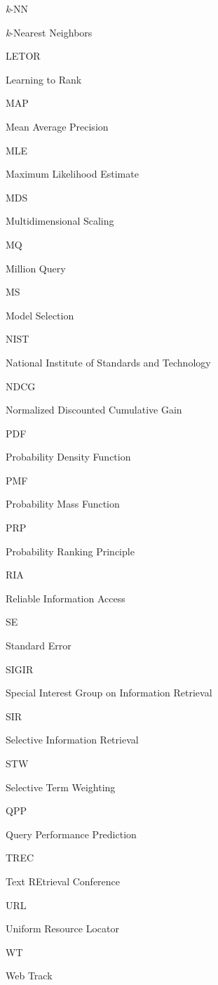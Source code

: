 \noindent \parbox[t]{1.5in}{\emph{k}-NN}
\parbox[t]{5in}{\emph{k}-Nearest Neighbors}

\noindent \parbox[t]{1.5in}{LETOR}
\parbox[t]{5in}{Learning to Rank}

\noindent \parbox[t]{1.5in}{MAP}
\parbox[t]{5in}{Mean Average Precision}

\noindent \parbox[t]{1.5in}{MLE}
\parbox[t]{5in}{Maximum Likelihood Estimate}

\noindent \parbox[t]{1.5in}{MDS}
\parbox[t]{5in}{Multidimensional Scaling}

\noindent \parbox[t]{1.5in}{MQ}
\parbox[t]{5in}{Million Query}

\noindent \parbox[t]{1.5in}{MS}
\parbox[t]{5in}{Model Selection}

\noindent \parbox[t]{1.5in}{NIST}
\parbox[t]{5in}{National Institute of Standards and Technology}

\noindent \parbox[t]{1.5in}{NDCG}
\parbox[t]{5in}{Normalized Discounted Cumulative Gain}

\noindent \parbox[t]{1.5in}{PDF}
\parbox[t]{5in}{Probability Density Function}

\noindent \parbox[t]{1.5in}{PMF}
\parbox[t]{5in}{Probability Mass Function}

\noindent \parbox[t]{1.5in}{PRP}
\parbox[t]{5in}{Probability Ranking Principle}

\noindent \parbox[t]{1.5in}{RIA}
\parbox[t]{5in}{Reliable Information Access}

\noindent \parbox[t]{1.5in}{SE}
\parbox[t]{5in}{Standard Error}

\noindent \parbox[t]{1.5in}{SIGIR}
\parbox[t]{5in}{Special Interest Group on Information Retrieval}

\noindent \parbox[t]{1.5in}{SIR}
\parbox[t]{5in}{Selective Information Retrieval}

\noindent \parbox[t]{1.5in}{STW}
\parbox[t]{5in}{Selective Term Weighting}

\noindent \parbox[t]{1.5in}{QPP}
\parbox[t]{5in}{Query Performance Prediction}

\noindent \parbox[t]{1.5in}{TREC}
\parbox[t]{5in}{Text REtrieval Conference}

\noindent \parbox[t]{1.5in}{URL}
\parbox[t]{5in}{Uniform Resource Locator}

\noindent \parbox[t]{1.5in}{WT}
\parbox[t]{5in}{Web Track}